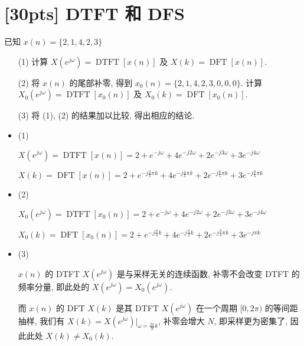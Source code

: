 \documentclass[a4paper,UTF8]{article}
\numberwithin{equation}{section}
\begin{document}
	\newpage
	\section{[30pts] DTFT 和 DFS}
	已知 $x(n)=\{2,1,4,2,3\}$
	\begin{itemize}
		\item[(1)]计算 $X({e}^{{j}\omega})=\operatorname{DTFT}[x(n)]$ 及 $X(k)=\operatorname{DFT}[x(n)]$.
		\item[(2)]将 $x(n)$ 的尾部补零, 得到 $x_0(n)=\{2, 1,4,2,3,0,0,0\}$. 计算 $X_0({e}^{j \omega})=\operatorname{DTFT}[x_0(n)]$ 及 $X_0(k)=\operatorname{DFT}[x_0(n)]$.
		\item[(3)]将 (1), (2) 的结果加以比较, 得出相应的结论.
	\end{itemize}
	
	\begin{framed}
		\begin{spacing}{1.5}
			\begin{itemize}
        \item (1)

        $\displaystyle X(e^{j\omega}) = \operatorname{DTFT}[x(n)] = 2 + e^{-j\omega} + 4e^{-j 2\omega} + 2e^{-j 3\omega} + 3e^{-j 4\omega}$
        
        $\displaystyle X(k) = \operatorname{DFT}[x(n)] = 2 + e^{-j \frac{2}{5}\pi k} + 4e^{-j \frac{4}{5}\pi k} + 2e^{-j \frac{6}{5}\pi k} + 3e^{-j \frac{8}{5}\pi k}$
        
        \item (2)
        
        $\displaystyle X_0(e^{j\omega}) = \operatorname{DTFT}[x_0(n)] = 2 + e^{-j\omega} + 4e^{-j 2\omega} + 2e^{-j 3\omega} + 3e^{-j 4\omega}$
        
        $\displaystyle X_0(k) = \operatorname{DFT}[x_0(n)] = 2 + e^{-j \frac{\pi}{4} k} + 4e^{-j \frac{\pi}{2} k} + 2e^{-j \frac{3}{4}\pi k} + 3e^{-j \pi k}$
        
        \item (3)
        
        $x(n)$ 的 DTFT $X(e^{j\omega})$ 是与采样无关的连续函数, 补零不会改变 DTFT 的频率分量, 即此处的 $X(e^{j\omega}) = X_0(e^{j\omega})$.
        
        而 $x(n)$ 的 DFT $X(k)$ 是其 DTFT $X(e^{j\omega})$ 在一个周期 $[0, 2\pi)$ 的等间距抽样, 我们有 $X(k) = X(e^{j\omega})|_{\omega=\frac{2\pi}{N}k}$, 补零会增大 $N$, 即采样更为密集了, 因此此处 $X(k) \neq X_0(k)$.
			\end{itemize}
		\end{spacing}
	\end{framed}
	
	
\end{document}
